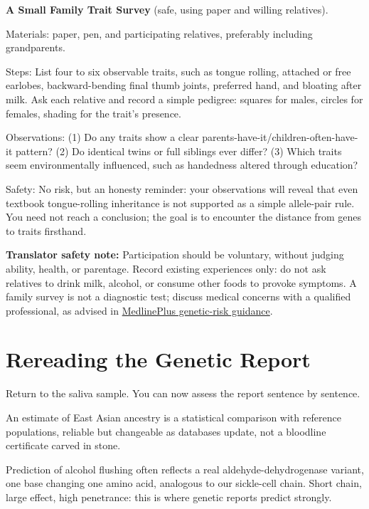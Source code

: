 \begin{shiyan}
\textbf{A Small Family Trait Survey} (safe, using paper and willing relatives).

Materials: paper, pen, and participating relatives, preferably including grandparents.

Steps: List four to six observable traits, such as tongue rolling, attached or free earlobes, backward-bending final thumb joints, preferred hand, and bloating after milk. Ask each relative and record a simple pedigree: squares for males, circles for females, shading for the trait's presence.

Observations: (1) Do any traits show a clear parents-have-it/children-often-have-it pattern? (2) Do identical twins or full siblings ever differ? (3) Which traits seem environmentally influenced, such as handedness altered through education?

Safety: No risk, but an honesty reminder: your observations will reveal that even textbook tongue-rolling inheritance is not supported as a simple allele-pair rule. You need not reach a conclusion; the goal is to encounter the distance from genes to traits firsthand.
\end{shiyan}

\textbf{Translator safety note:} Participation should be voluntary, without judging ability, health, or parentage. Record existing experiences only: do not ask relatives to drink milk, alcohol, or consume other foods to provoke symptoms. A family survey is not a diagnostic test; discuss medical concerns with a qualified professional, as advised in \href{https://medlineplus.gov/genetics/understanding/inheritance/riskassessment/}{MedlinePlus genetic-risk guidance}.

\section{Rereading the Genetic Report}

Return to the saliva sample. You can now assess the report sentence by sentence.

An estimate of East Asian ancestry is a statistical comparison with reference populations, reliable but changeable as databases update, not a bloodline certificate carved in stone.

Prediction of alcohol flushing often reflects a real aldehyde-dehydrogenase variant, one base changing one amino acid, analogous to our sickle-cell chain. Short chain, large effect, high penetrance: this is where genetic reports predict strongly.

